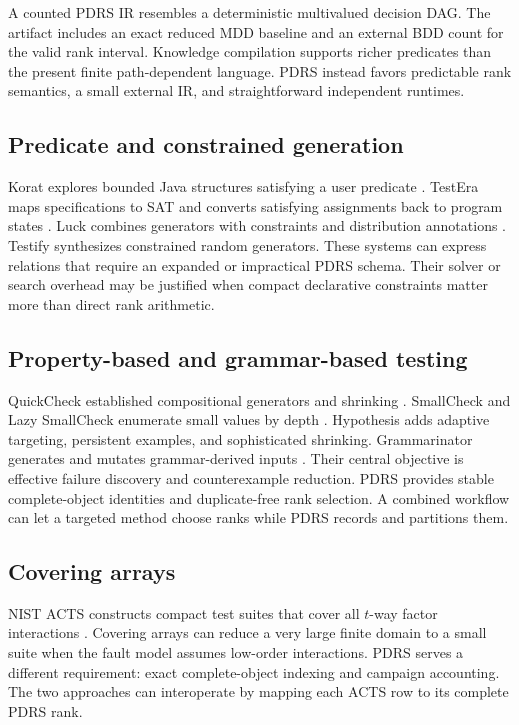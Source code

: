 A counted PDRS IR resembles a deterministic multivalued decision DAG. The artifact includes an exact reduced MDD baseline and an external BDD count for the valid rank interval. Knowledge compilation supports richer predicates than the present finite path-dependent language. PDRS instead favors predictable rank semantics, a small external IR, and straightforward independent runtimes.

\subsection{Predicate and constrained generation}
Korat explores bounded Java structures satisfying a user predicate \cite{korat2002}. TestEra maps specifications to SAT and converts satisfying assignments back to program states \cite{testera2004}. Luck combines generators with constraints and distribution annotations \cite{luck2017}. Testify synthesizes constrained random generators. These systems can express relations that require an expanded or impractical PDRS schema. Their solver or search overhead may be justified when compact declarative constraints matter more than direct rank arithmetic.

\subsection{Property-based and grammar-based testing}
QuickCheck established compositional generators and shrinking \cite{quickcheck2000}. SmallCheck and Lazy SmallCheck enumerate small values by depth \cite{smallcheck2008}. Hypothesis adds adaptive targeting, persistent examples, and sophisticated shrinking. Grammarinator generates and mutates grammar-derived inputs \cite{grammarinator2018}. Their central objective is effective failure discovery and counterexample reduction. PDRS provides stable complete-object identities and duplicate-free rank selection. A combined workflow can let a targeted method choose ranks while PDRS records and partitions them.

\subsection{Covering arrays}
NIST ACTS constructs compact test suites that cover all \(t\)-way factor interactions \cite{acts2010}. Covering arrays can reduce a very large finite domain to a small suite when the fault model assumes low-order interactions. PDRS serves a different requirement: exact complete-object indexing and campaign accounting. The two approaches can interoperate by mapping each ACTS row to its complete PDRS rank.

